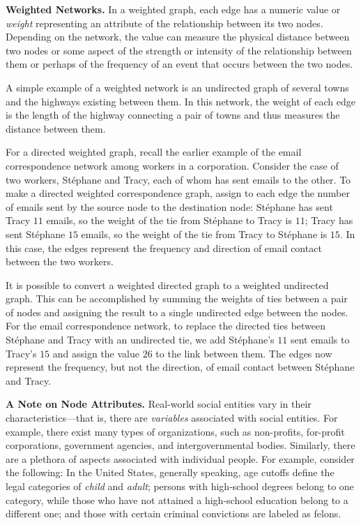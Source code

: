 \documentclass{book}
\begin{document}
\textbf{Weighted Networks.} In a weighted graph, each edge has a numeric value
or \emph{weight} representing an attribute of the relationship between its two
nodes. Depending on the network, the value can measure the physical distance
between two nodes or some aspect of the strength or intensity of the
relationship between them or perhaps of the frequency of an event that occurs
between the two nodes.

A simple example of a weighted network is an undirected graph of several towns
and the highways existing between them. In this network, the weight of each
edge is the length of the highway connecting a pair of towns and thus measures
the distance between them.

For a directed weighted graph, recall the earlier example of the email
correspondence network among workers in a corporation. Consider the case of
two workers, Stéphane and Tracy, each of whom has sent emails to the other. To
make a directed weighted correspondence graph, assign to each edge the number
of emails sent by the source node to the destination node: Stéphane has sent
Tracy \(11\) emails, so the weight of the tie from Stéphane to Tracy is
\(11\); Tracy has sent Stéphane \(15\) emails, so the weight of the tie from
Tracy to Stéphane is \(15\). In this case, the edges represent the frequency
and direction of email contact between the two workers.

It is possible to convert a weighted directed graph to a weighted undirected
graph. This can be accomplished by summing the weights of ties between a pair
of nodes and assigning the result to a single undirected edge between the
nodes. For the email correspondence network, to replace the directed ties
between Stéphane and Tracy with an undirected tie, we add Stéphane's \(11\)
sent emails to Tracy's \(15\) and assign the value \(26\) to the link between
them. The edges now represent the frequency, but not the direction, of email
contact between Stéphane and Tracy.

\textbf{A Note on Node Attributes.} Real-world social entities vary in their
characteristics---that is, there are \emph{variables} associated with social
entities. For example, there exist many types of organizations, such as
non-profits, for-profit corporations, government agencies, and
intergovernmental bodies. Similarly, there are a plethora of aspects
associated with individual people. For example, consider the following: In the
United States, generally speaking, age cutoffs define the legal categories of
\emph{child} and \emph{adult}; persons with high-school degrees belong to one
category, while those who have not attained a high-school education belong to
a different one; and those with certain criminal convictions are labeled as
felons.
\end{document}
